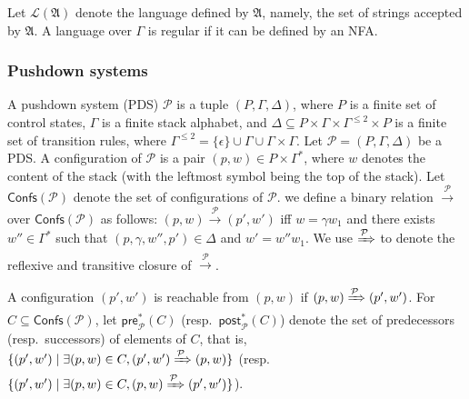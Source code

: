 \documentclass[preprint,12pt]{elsarticle}
\newcommand\Pp{{\mathcal{P} }}
\newcommand\confs{{\mathsf{Confs} }}
\newcommand\conf{{\mathsf{Conf} }}
\newcommand\pre{{\mathsf{pre} }}
\newcommand\post{{\mathsf{post} }}
\newcommand\Aut{{\mathfrak{A} }}
\newcommand\Lang{{\mathscr{L} }}
\newcommand{\PDS}{\textsf{PDS}}
\newcommand{\NFA}{\textsf{NFA}}
\begin{document}
Let $\Lang(\Aut)$ denote the language defined by $\Aut$, namely, the set of strings accepted by $\Aut$. 
A language over $\Gamma$ is regular if it can be defined by an \NFA.
 


\subsubsection{Pushdown systems}
A pushdown system ({\PDS}) $\Pp$ is a tuple $(P,\Gamma,\Delta)$, where $P$ is a finite set of control states, $\Gamma$ is a finite stack alphabet, and $\Delta\subseteq P\times\Gamma\times\Gamma^{\le 2}\times P$ is a finite set of transition rules, where $\Gamma^{\le 2} = \{\epsilon\}\cup\Gamma\cup\Gamma\times\Gamma$.
Let $\Pp=(P,\Gamma,\Delta)$ be a {\PDS}. A configuration of $\Pp$ is a pair $(p,w)\in P\times\Gamma^*$, where $w$ denotes the content of the stack (with the leftmost symbol being the top of the stack). Let $\confs(\Pp)$ denote the set of configurations of $\Pp$. we define a binary relation $\xrightarrow{\Pp}$ over $\confs(\Pp)$ as follows: $(p,w)\xrightarrow{\Pp}(p',w')$ iff $w = \gamma w_1$ and there exists $w''\in\Gamma^*$ such that $(p,\gamma,w'',p')\in\Delta$ and $w'=w''w_1$. We use $\xRightarrow{\Pp}$ to denote the reflexive and transitive closure of $\xrightarrow{\Pp}$.

A configuration $(p',w')$ is reachable from $(p,w)$ if $(p,w)\xRightarrow{\Pp}(p',w')$. For $C \subseteq \confs(\Pp)$, let $\pre^*_\Pp(C)$ (resp.\ $\post^*_\Pp(C)$) denote the set of predecessors (resp.\ successors) of elements of $C$, that is, $\{(p',w')\mid \exists (p,w)\in C,(p',w')\xRightarrow{\Pp}(p,w)\}$ (resp.\ $\{(p',w')\mid \exists (p,w)\in C,(p,w)\xRightarrow{\Pp}(p',w')\}$).

\end{document}
